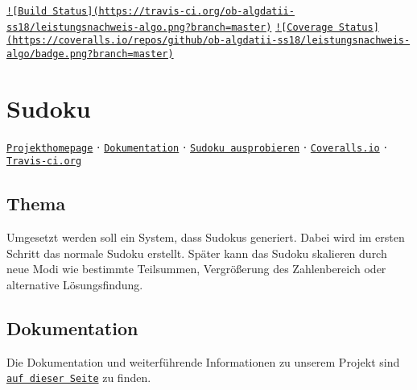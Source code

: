 \href{https://travis-ci.org/ob-algdatii-ss18/leistungsnachweis-algo}{\tt !\mbox{[}Build Status\mbox{]}(https\-://travis-\/ci.\-org/ob-\/algdatii-\/ss18/leistungsnachweis-\/algo.\-png?branch=master)} \href{https://coveralls.io/github/ob-algdatii-ss18/leistungsnachweis-algo?branch=master}{\tt !\mbox{[}Coverage Status\mbox{]}(https\-://coveralls.\-io/repos/github/ob-\/algdatii-\/ss18/leistungsnachweis-\/algo/badge.\-png?branch=master)}

\section*{Sudoku}

\href{https://ob-algdatii-ss18.github.io/leistungsnachweis-algo/}{\tt Projekthomepage} ⋅ \href{https://ob-algdatii-ss18.github.io/leistungsnachweis-algo/doxygen_doc/html/index.html}{\tt Dokumentation} ⋅ \href{https://ob-algdatii-ss18.github.io/leistungsnachweis-algo/}{\tt Sudoku ausprobieren} ⋅ \href{https://coveralls.io/github/ob-algdatii-ss18/leistungsnachweis-algo/}{\tt Coveralls.\-io} ⋅ \href{https://travis-ci.org/ob-algdatii-ss18/leistungsnachweis-algo}{\tt Travis-\/ci.\-org} \subsection*{Thema}

Umgesetzt werden soll ein System, dass Sudokus generiert. Dabei wird im ersten Schritt das normale Sudoku erstellt. Später kann das Sudoku skalieren durch neue Modi wie bestimmte Teilsummen, Vergrößerung des Zahlenbereich oder alternative Lösungsfindung. \subsection*{Dokumentation}

Die Dokumentation und weiterführende Informationen zu unserem Projekt sind \href{https://ob-algdatii-ss18.github.io/leistungsnachweis-algo/}{\tt auf dieser Seite} zu finden. 
